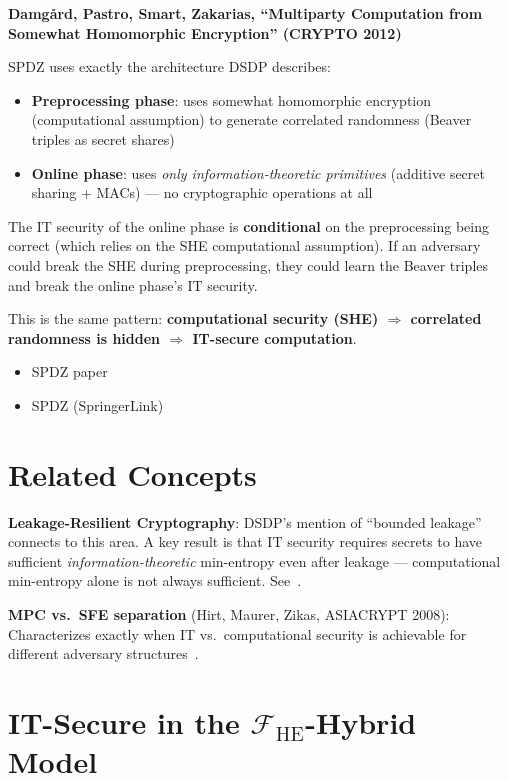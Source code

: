 \documentclass{article}
\begin{document}
\textbf{Damg\r{a}rd, Pastro, Smart, Zakarias, ``Multiparty Computation from Somewhat Homomorphic Encryption'' (CRYPTO 2012)}

SPDZ uses exactly the architecture DSDP describes:

\begin{itemize}
  \item \textbf{Preprocessing phase}: uses somewhat homomorphic encryption (computational assumption) to generate correlated randomness (Beaver triples as secret shares)
  \item \textbf{Online phase}: uses \emph{only information-theoretic primitives} (additive secret sharing + MACs) --- no cryptographic operations at all
\end{itemize}

The IT security of the online phase is \textbf{conditional} on the preprocessing being correct (which relies on the SHE computational assumption). If an adversary could break the SHE during preprocessing, they could learn the Beaver triples and break the online phase's IT security.

This is the same pattern: \textbf{computational security (SHE) $\Rightarrow$ correlated randomness is hidden $\Rightarrow$ IT-secure computation}.

\begin{itemize}
  \item SPDZ paper~\cite{SPDZ2012eprint}
  \item SPDZ (SpringerLink)~\cite{SPDZ2012springer}
\end{itemize}

\section{Related Concepts}

\textbf{Leakage-Resilient Cryptography}: DSDP's mention of ``bounded leakage'' connects to this area. A key result is that IT security requires secrets to have sufficient \emph{information-theoretic} min-entropy even after leakage --- computational min-entropy alone is not always sufficient. See~\cite{LeakageUnprovability2020}.

\textbf{MPC vs.\ SFE separation} (Hirt, Maurer, Zikas, ASIACRYPT 2008): Characterizes exactly when IT vs.\ computational security is achievable for different adversary structures~\cite{HirtMaurerZikas2008}.

\section{IT-Secure in the $\mathcal{F}_{\mathrm{HE}}$-Hybrid Model}
\end{document}
